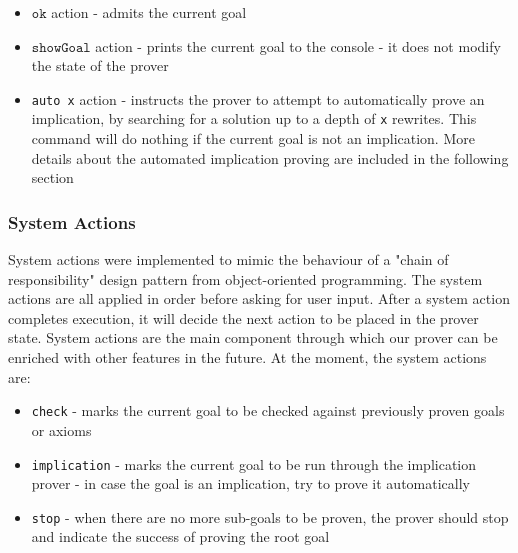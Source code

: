 \documentclass[12pt,a4paper]{article}
\begin{document}
{\begin{itemize}
\begin{itemize}
			\item If the result corresponds to what the prover was expecting, we modify the state by adding the newly generated goals to the \texttt{GoalStack}, by moving down the "meta"-hierarchy - parsing meta-representation of terms.
			\item The last thing to note is an example of how the rules generate output independent of other applications. In the last field of the \texttt{Prover State}, as \texttt{StagingOutput}, there will be a list of quoted identifiers which will eventually get moved to the loop state and then outputted to the user.
		\end{itemize}
		All the other actions which control the application of proof rules are written in a similar manner.
	\item {\(\mathtt{ok}\) action - admits the current goal}
	\item {\(\mathtt{showGoal}\) action - prints the current goal to the console - it does not modify the state of the prover}
	\item {\texttt{auto x}} action - instructs the prover to attempt to automatically prove an implication, by searching for a solution up to a depth of \texttt{x} rewrites. This command will do nothing if the current goal is not an implication. More details about the automated implication proving are included in the following section
\end{itemize}
\subsubsection{System Actions}
System actions were implemented to mimic the behaviour of a "chain of responsibility" design pattern from object-oriented programming. The system actions are all applied in order before asking for user input. After a system action completes execution, it will decide the next action to be placed in the prover state. System actions are the main component through which our prover can be enriched with other features in the future. At the moment, the system actions are:
\begin{itemize}
	\item {\texttt{check}} - marks the current goal to be checked against previously proven goals or axioms
	\item {\texttt{implication}} - marks the current goal to be run through the implication prover - in case the goal is an implication, try to prove it automatically
	\item {\texttt{stop}} - when there are no more sub-goals to be proven, the prover should stop and indicate the success of proving the root goal
\end{itemize}
}
\end{document}
